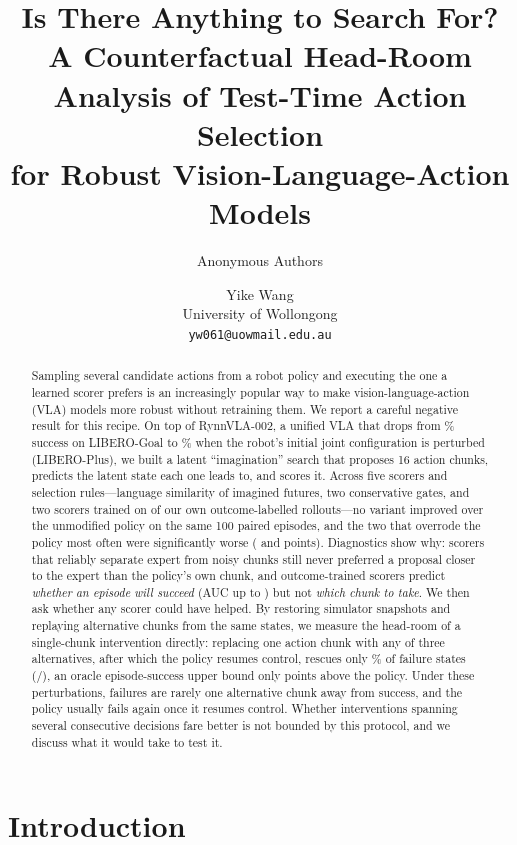 \documentclass[11pt]{article}
\title{\textbf{Is There Anything to Search For?\\ A Counterfactual Head-Room Analysis of Test-Time Action Selection\\ for Robust Vision-Language-Action Models}}
\author{Anonymous Authors}
\author{Yike Wang\\
University of Wollongong\\
\texttt{yw061@uowmail.edu.au}}
\date{}
\begin{document}
\maketitle

\begin{abstract}
Sampling several candidate actions from a robot policy and executing the one a learned scorer prefers is an increasingly popular way to make vision-language-action (VLA) models more robust without retraining them. We report a careful negative result for this recipe. On top of RynnVLA-002, a unified VLA that drops from \goalVanilla\% success on LIBERO-Goal to \goalPlusRobot\% when the robot's initial joint configuration is perturbed (LIBERO-Plus), we built a latent ``imagination'' search that proposes 16 action chunks, predicts the latent state each one leads to, and scores it. Across five scorers and selection rules---language similarity of imagined futures, two conservative gates, and two scorers trained on \rollEpisodes{} of our own outcome-labelled rollouts---no variant improved over the unmodified policy on the same 100 paired episodes, and the two that overrode the policy most often were significantly worse (\pilotDiff{} and \directDiff{} points). Diagnostics show why: scorers that reliably separate expert from noisy chunks still never preferred a proposal closer to the expert than the policy's own chunk, and outcome-trained scorers predict \emph{whether an episode will succeed} (AUC up to \aucDirect) but not \emph{which chunk to take}. We then ask whether any scorer could have helped. By restoring simulator snapshots and replaying alternative chunks from the same states, we measure the head-room of a single-chunk intervention directly: replacing one action chunk with any of three alternatives, after which the policy resumes control, rescues only \rescPts\% of failure states (\rescPtsK/\rescPtsN), an oracle episode-success upper bound only \oracleGain{} points above the policy. Under these perturbations, failures are rarely one alternative chunk away from success, and the policy usually fails again once it resumes control. Whether interventions spanning several consecutive decisions fare better is not bounded by this protocol, and we discuss what it would take to test it.
\end{abstract}

\section{Introduction}
\end{document}
